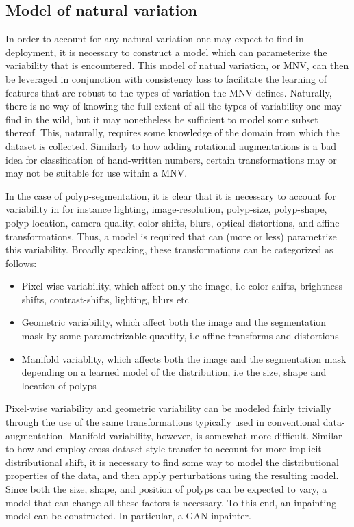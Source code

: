   	\subsection{Model of natural variation}
  	In order to account for any natural variation one may expect to find in deployment, it is necessary to construct a model which can parameterize the variability that is encountered. This model of natual variation, or MNV, can then be leveraged in conjunction with consistency loss to facilitate the learning of features that are robust to the types of variation the MNV defines. Naturally, there is no way of knowing the full extent of all the types of variability one may find in the wild, but it may nonetheless be sufficient to model some subset thereof. This, naturally, requires some knowledge of the domain from which the dataset is collected. Similarly to how adding rotational augmentations is a bad idea for classification of hand-written numbers, certain transformations may or may not be suitable for use within a MNV.
  		
  	In the case of polyp-segmentation, it is clear that it is necessary to account for variability in for instance lighting, image-resolution, polyp-size, polyp-shape, polyp-location, camera-quality, color-shifts, blurs, optical distortions, and affine transformations. Thus, a model is required that can (more or less) parametrize this variability. Broadly speaking, these transformations can be categorized as follows:
    \begin{itemize}
        \item Pixel-wise variability, which affect only the image, i.e color-shifts, brightness shifts, contrast-shifts, lighting, blurs etc
        \item Geometric variability, which affect both the image and the segmentation mask by some parametrizable quantity, i.e affine transforms and distortions
        \item Manifold variablity, which affects both the image and the segmentation mask depending on a learned model of the distribution,  i.e the size, shape and location of polyps
    \end{itemize}
    Pixel-wise variability and geometric variability can be modeled fairly trivially through the use of the same transformations typically used in conventional data-augmentation. Manifold-variability, however, is somewhat more difficult. Similar to how \cite{modelbased} and \cite{cyclegan} employ cross-dataset style-transfer to account for more implicit distributional shift, it is necessary to find some way to model the distributional properties of the data, and then apply perturbations using the resulting model. Since both the size, shape, and position of polyps can be expected to vary, a model that can change all these factors is necessary. To this end, an inpainting model can be constructed. In particular, a GAN-inpainter. 
